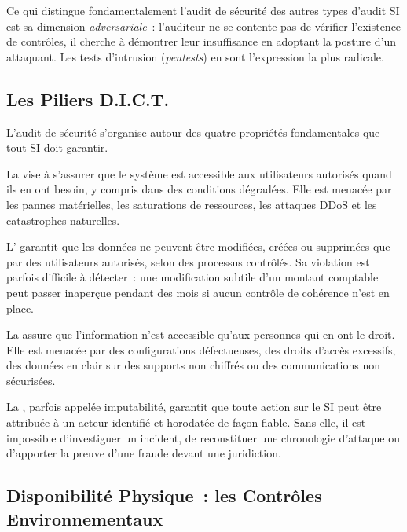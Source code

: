 Ce qui distingue fondamentalement l'audit de sécurité des autres types d'audit SI
est sa dimension \textit{adversariale}~: l'auditeur ne se contente pas de vérifier
l'existence de contrôles, il cherche à démontrer leur insuffisance en adoptant la
posture d'un attaquant. Les tests d'intrusion (\textit{pentests}) en sont l'expression
la plus radicale.

\subsection{Les Piliers D.I.C.T.}
\label{subsec:dict}

L'audit de sécurité s'organise autour des quatre propriétés fondamentales que tout
SI doit garantir.

La  vise à s'assurer que le système est accessible aux
utilisateurs autorisés quand ils en ont besoin, y compris dans des conditions
dégradées. Elle est menacée par les pannes matérielles, les saturations de ressources,
les attaques DDoS et les catastrophes naturelles.

L' garantit que les données ne peuvent être modifiées, créées
ou supprimées que par des utilisateurs autorisés, selon des processus contrôlés.
Sa violation est parfois difficile à détecter~: une modification subtile d'un montant
comptable peut passer inaperçue pendant des mois si aucun contrôle de cohérence
n'est en place.

La  assure que l'information n'est accessible qu'aux
personnes qui en ont le droit. Elle est menacée par des configurations défectueuses,
des droits d'accès excessifs, des données en clair sur des supports non chiffrés ou
des communications non sécurisées.

La , parfois appelée imputabilité, garantit que toute action
sur le SI peut être attribuée à un acteur identifié et horodatée de façon fiable.
Sans elle, il est impossible d'investiguer un incident, de reconstituer une chronologie
d'attaque ou d'apporter la preuve d'une fraude devant une juridiction.

\subsection{Disponibilité Physique~: les Contrôles Environnementaux}
\label{subsec:controles-environnementaux}

